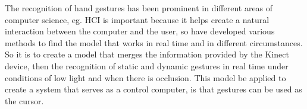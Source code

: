 The recognition of hand gestures has been prominent in different areas of computer science, eg. HCI is important because it helps create a natural interaction between the computer and the user, so have developed various methods to find the model that works in real time and in different circumstances. So it is to create a model that merges the information provided by the Kinect device, then the recognition of static and dynamic gestures in real time under conditions of low light and when there is occlusion. This model be applied to create a system that serves as a control computer, is that gestures can be used as the cursor.